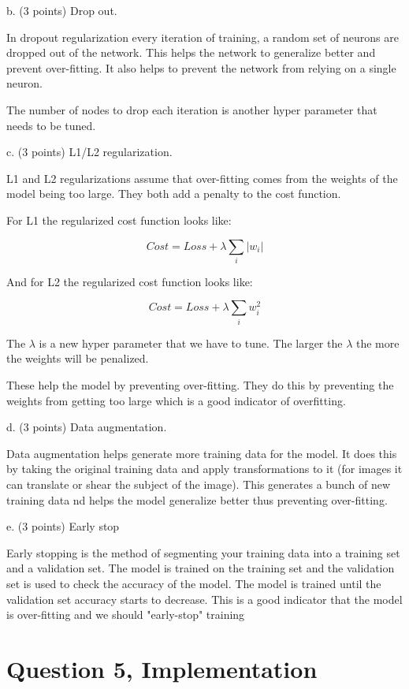 \documentclass{article}
\begin{document}
b. (3 points) Drop out.

In dropout regularization every iteration of training, a random set of neurons are dropped out of the network. This helps the network to generalize better and prevent over-fitting. It also helps to prevent the network from relying on a single neuron.

The number of nodes to drop each iteration is another hyper parameter that needs to be tuned.


c. (3 points) L1/L2 regularization.

L1 and L2 regularizations assume that over-fitting comes from the weights of the model being too large. They both add a penalty to the cost function.

For L1 the regularized cost function looks like:

$$ Cost = Loss + \lambda \sum_{i} |w_i| $$

And for L2 the regularized cost function looks like:

$$ Cost = Loss + \lambda \sum_{i} w_i^2 $$

The $\lambda$ is a new hyper parameter that we have to tune. The larger the $\lambda$ the more the weights will be penalized.

These help the model by preventing over-fitting. They do this by preventing the weights from getting too large which is a good indicator of overfitting.

d. (3 points) Data augmentation.

Data augmentation helps generate more training data for the model. It does this by taking the original training data and apply transformations to it (for images it can translate or shear the subject of the image). This generates a bunch of new training data nd helps the model generalize better thus preventing over-fitting.

e. (3 points) Early stop

Early stopping is the method of segmenting your training data into a training set and a validation set. The model is trained on the training set and the validation set is used to check the accuracy of the model. The model is trained until the validation set accuracy starts to decrease. This is a good indicator that the model is over-fitting and we should "early-stop" training



\section*{Question 5, Implementation}
\end{document}
